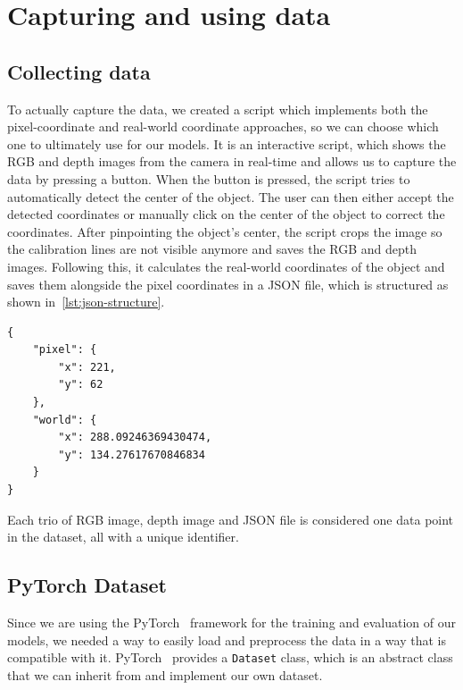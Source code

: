 \section{Capturing and using data}\label{ch:dataset_section:capturing-and-saving-data}

\subsection{Collecting data}\label{ch:dataset_section:capturing-and-saving-data_subsection:collecting-data}
To actually capture the data, we created a script which implements both the pixel-coordinate and real-world coordinate approaches, so we can choose which one to ultimately use for our models.
It is an interactive script, which shows the RGB and depth images from the camera in real-time and allows us to capture the data by pressing a button.
When the button is pressed, the script tries to automatically detect the center of the object.
The user can then either accept the detected coordinates or manually click on the center of the object to correct the coordinates.
After pinpointing the object's center, the script crops the image so the calibration lines are not visible anymore and saves the RGB and depth images.
Following this, it calculates the real-world coordinates of the object and saves them alongside the pixel coordinates in a JSON file, which is structured as shown in~\cref{lst:json-structure}.

\begin{listing}
\begin{verbatim}
{
    "pixel": {
        "x": 221,
        "y": 62
    },
    "world": {
        "x": 288.09246369430474,
        "y": 134.27617670846834
    }
}
\end{verbatim}
\caption{Example of the JSON file structure.}
\label{lst:json-structure}
\end{listing}

Each trio of RGB image, depth image and JSON file is considered one data point in the dataset, all with a unique identifier.

\subsection{PyTorch Dataset}\label{ch:dataset_section:capturing-and-saving-data_subsection:pytorch-dataset}
Since we are using the PyTorch~\cite{src:pytorch} framework for the training and evaluation of our models, we needed a way to easily load and preprocess the data in a way that is compatible with it.
PyTorch~\cite{src:pytorch} provides a \texttt{Dataset} class, which is an abstract class that we can inherit from and implement our own dataset.

